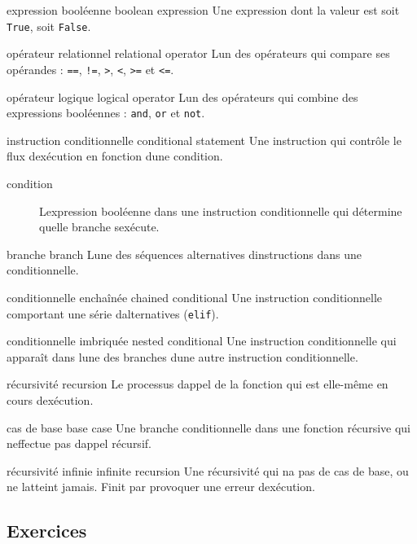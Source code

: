 expression booléenne boolean expression Une expression dont la valeur
est soit \texttt{True}, soit \texttt{False}.

opérateur relationnel relational operator L\textquotesingle un des
opérateurs qui compare ses opérandes : \texttt{==}, \texttt{!=},
\texttt{\textgreater{}}, \texttt{\textless{}}, \texttt{\textgreater{}=}
et \texttt{\textless{}=}.

opérateur logique logical operator L\textquotesingle un des opérateurs
qui combine des expressions booléennes : \texttt{and}, \texttt{or} et
\texttt{not}.

instruction conditionnelle conditional statement Une instruction qui
contrôle le flux d\textquotesingle exécution en fonction
d\textquotesingle une condition.

\begin{description}
\item[condition]
L\textquotesingle expression booléenne dans une instruction
conditionnelle qui détermine quelle branche s\textquotesingle exécute.
\end{description}

branche branch L\textquotesingle une des séquences alternatives
d\textquotesingle instructions dans une conditionnelle.

conditionnelle enchaînée chained conditional Une instruction
conditionnelle comportant une série d\textquotesingle alternatives
(\texttt{elif}).

conditionnelle imbriquée nested conditional Une instruction
conditionnelle qui apparaît dans l\textquotesingle une des branches
d\textquotesingle une autre instruction conditionnelle.

récursivité recursion Le processus d\textquotesingle appel de la
fonction qui est elle-même en cours d\textquotesingle exécution.

cas de base base case Une branche conditionnelle dans une fonction
récursive qui n\textquotesingle effectue pas d\textquotesingle appel
récursif.

récursivité infinie infinite recursion Une récursivité qui
n\textquotesingle a pas de cas de base, ou ne l\textquotesingle atteint
jamais. Finit par provoquer une erreur d\textquotesingle exécution.

\hypertarget{exercices}{%
\subsection{Exercices}\label{exercices}}

